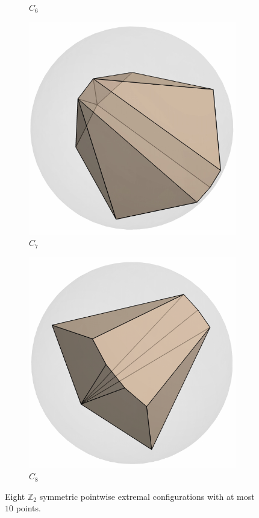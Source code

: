 \documentclass[12pt]{amsart}
\theoremstyle{plain}
\numberwithin{equation}{section}
\begin{document}
\begin{figure}[H]
\begin{subfigure}[b]{0.22\textwidth}
		\caption{$C_6$}
	\end{subfigure}
	\hfill
	\begin{subfigure}[b]{0.22\textwidth}
		\centering
		\includegraphics[scale=0.4]{./figures/small_C7.pdf}
		\caption{$C_7$}
	\end{subfigure}
	\hfill
	\begin{subfigure}[b]{0.22\textwidth}
		\centering
		\includegraphics[scale=0.4]{./figures/small_C8.pdf}
		\caption{$C_8$}
	\end{subfigure}
	\caption{Eight $\mathbb{Z}_2$ symmetric pointwise extremal
          configurations with at most $10$ points.}
	\label{tbl:type_C_figures}
\end{figure}
\end{document}
